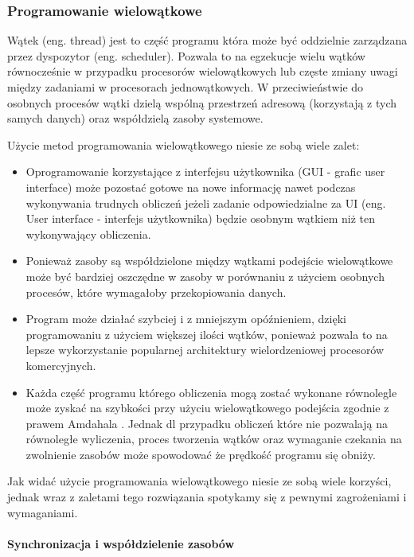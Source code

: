 \subsubsection{Programowanie wielowątkowe}

Wątek (eng. thread) jest to część programu która może być oddzielnie zarządzana przez dyspozytor (eng. scheduler). 
Pozwala to na egzekucje wielu wątków równocześnie w przypadku procesorów wielowątkowych lub częste zmiany uwagi między zadaniami w procesorach jednowątkowych.
W przeciwieństwie do osobnych procesów wątki dzielą wspólną przestrzeń adresową (korzystają z tych samych danych) oraz współdzielą zasoby systemowe.

Użycie metod programowania wielowątkowego niesie ze sobą wiele zalet:
\begin{itemize}
        \item Oprogramowanie korzystające z interfejsu użytkownika (GUI - grafic user interface) może pozostać gotowe na nowe informację nawet podczas wykonywania trudnych obliczeń jeżeli zadanie odpowiedzialne za UI (eng. User interface - interfejs użytkownika) będzie osobnym wątkiem niż ten wykonywający obliczenia.
        \item Ponieważ zasoby są współdzielone między wątkami podejście wielowątkowe może być bardziej oszczędne w zasoby w porównaniu z użyciem osobnych procesów, które wymagałoby przekopiowania danych.
        \item Program może działać szybciej i z mniejszym opóźnieniem, dzięki programowaniu z użyciem większej ilości wątków, ponieważ pozwala to na lepsze wykorzystanie popularnej architektury wielordzeniowej procesorów komercyjnych. 
        \item Każda część programu którego obliczenia mogą zostać wykonane równolegle może zyskać na szybkości przy użyciu wielowątkowego podejścia zgodnie z prawem Amdahala \cite{arch}. 
        Jednak dl przypadku obliczeń które nie pozwalają na równoległe wyliczenia, proces tworzenia wątków oraz wymaganie czekania na zwolnienie zasobów może spowodować że prędkość programu się obniży.
\end{itemize}
Jak widać użycie programowania wielowątkowego niesie ze sobą wiele korzyści,
jednak wraz z zaletami tego rozwiązania spotykamy się z pewnymi zagrożeniami i wymaganiami.

\paragraph{Synchronizacja i współdzielenie zasobów}

